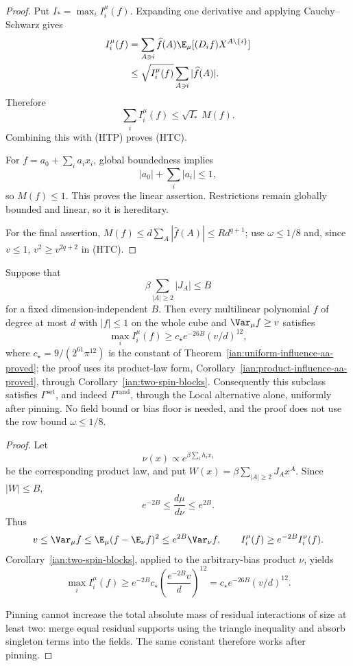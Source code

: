 \begin{proof}
Put \(I_*=\max_iI_i^\mu(f)\). Expanding one derivative and applying
Cauchy--Schwarz gives
\[
 \begin{split}
 I_i^\mu(f)
 &=\sum_{A\ni i}\widehat f(A)
       \E_\mu[(D_if)X^{A\setminus\{i\}}]\\
 &\le\sqrt{I_i^\mu(f)}
       \sum_{A\ni i}|\widehat f(A)|.
 \end{split}
\]
Therefore
\[
 \sum_iI_i^\mu(f)\le\sqrt{I_*}\,M(f).
\]
Combining this with (HTP) proves (HTC).

For \(f=a_0+\sum_i a_ix_i\), global boundedness implies
\[
 |a_0|+\sum_i|a_i|\le1,
\]
so \(M(f)\le1\). This proves the linear assertion. Restrictions
remain globally bounded and linear, so it is hereditary.

For the final assertion,
\(M(f)\le d\sum_A|\widehat f(A)|\le Rd^{q+1}\);
use \(\omega\le1/8\) and, since \(v\le1\), \(v^2\ge v^{2q+2}\) in (HTC).
\end{proof}

\begin{proposition}
\label{ian:interaction-budget-aa}
Suppose that
\[
 \beta\sum_{|A|\ge2}|J_A|\le B
\]
for a fixed dimension-independent \(B\).
Then every multilinear polynomial \(f\) of degree at most \(d\) with
\(|f|\le1\) on the whole cube and \(\Var_\mu f\ge v\) satisfies
\[
 \max_iI_i^\mu(f)
 \ge c_\star e^{-26B}(v/d)^{12},
\]
where \(c_\star=9/(2^{61}\pi^{12})\) is the constant of
Theorem~\ref{ian:uniform-influence-aa-proved}; the proof uses its
product-law form, Corollary~\ref{ian:product-influence-aa-proved},
through Corollary~\ref{ian:two-spin-blocks}.
Consequently this subclass satisfies
\(\Gamma^{\mathrm{set}}\), and indeed
\(\Gamma^{\mathrm{rand}}\), through the Local alternative alone,
uniformly after pinning. No field bound or bias floor is needed, and
the proof does not use the row bound \(\omega\le1/8\).
\end{proposition}

\begin{proof}
Let
\[
 \nu(x)\propto e^{\beta\sum_i h_ix_i}
\]
be the corresponding product law, and put
\(W(x)=\beta\sum_{|A|\ge2}J_Ax^A\).
Since \(|W|\le B\),
\[
 e^{-2B}\le\frac{d\mu}{d\nu}\le e^{2B}.
\]
Thus
\[
 v\le\Var_\mu f
 \le\E_\mu(f-\E_\nu f)^2
 \le e^{2B}\Var_\nu f,
 \qquad
 I_i^\mu(f)\ge e^{-2B}I_i^\nu(f).
\]
Corollary~\ref{ian:two-spin-blocks}, applied to the arbitrary-bias
product \(\nu\), yields
\[
 \max_iI_i^\mu(f)
 \ge e^{-2B}c_\star
          \left(\frac{e^{-2B}v}{d}\right)^{12}
 =c_\star e^{-26B}(v/d)^{12}.
\]

Pinning cannot increase the total absolute mass of residual
interactions of size at least two: merge equal residual supports
using the triangle inequality and absorb singleton terms into the
fields. The same constant therefore works after pinning.
\end{proof}

